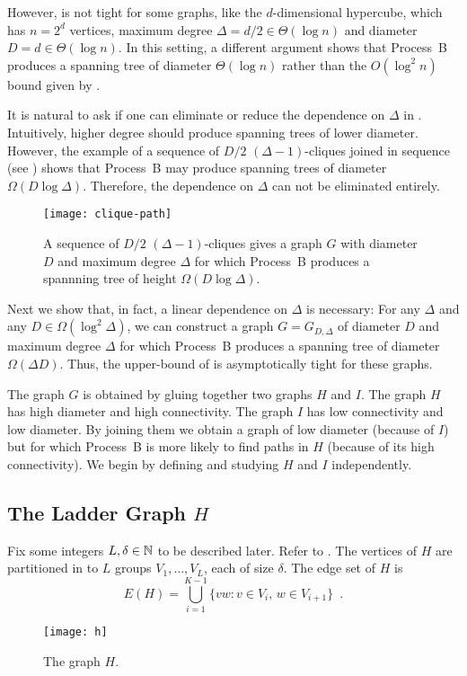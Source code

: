 \documentclass[lotsofwhite]{patmorin}
\begin{document}
However,  is not tight for some graphs, like
the $d$-dimensional hypercube, which has $n=2^d$ vertices, maximum degree
$\Delta = d/2 \in \Theta(\log n)$ and diameter $D=d\in\Theta(\log n)$.
In this setting, a different argument shows that Process~B produces a
spanning tree of diameter $\Theta(\log n)$ rather than the $O(\log^2 n)$
bound given by .

It is natural to ask if one can eliminate or reduce the dependence on
$\Delta$ in .  Intuitively, higher degree
should produce spanning trees of lower diameter.  However, the example
of a sequence of $D/2$ $(\Delta-1)$-cliques joined in sequence (see
) shows that Process~B may produce spanning trees of
diameter $\Omega(D\log\Delta)$.  Therefore, the dependence on $\Delta$
can not be eliminated entirely.

\begin{figure}
  \begin{center}
    \texttt{[image: clique-path]}
  \end{center}
  \caption{A sequence of $D/2$ $(\Delta-1)$-cliques gives a graph $G$
   with diameter $D$ and maximum degree $\Delta$ for which Process~B
   produces a spannning tree of height $\Omega(D\log\Delta)$.}
\end{figure}

Next we show that, in fact, a linear dependence on $\Delta$ is necessary:
For any $\Delta$ and any $D\in\Omega(\log^2\Delta)$, we can construct a
graph $G=G_{D,\Delta}$ of diameter $D$ and maximum degree $\Delta$ for
which Process~B produces a spanning tree of diameter $\Omega(\Delta D)$.
Thus, the upper-bound of  is asymptotically
tight for these graphs.

The graph $G$ is obtained by gluing together two graphs $H$ and $I$.
The graph $H$ has high diameter and high connectivity.  The graph $I$
has low connectivity and low diameter.  By joining them we obtain a graph
of low diameter (because of $I$) but for which Process~B is more likely
to find paths in $H$ (because of its high connectivity).  We begin by
defining and studying $H$ and $I$ independently.


\subsection{The Ladder Graph $H$}

Fix some integers $L,\delta\in\mathbb{N}$ to be described later.  Refer to
.  The vertices of $H$ are partitioned in to $L$ groups
$V_1,\ldots,V_L$, each of size $\delta$. The edge set of $H$ is
\[
   E(H) = \bigcup_{i=1}^{K-1} \{vw : v\in V_{i},\, w\in V_{i+1}\} \enspace .
\]
\begin{figure}
  \begin{center}
    \texttt{[image: h]} 
  \end{center}
  \caption{The graph $H$.}
\end{figure}
\end{document}
